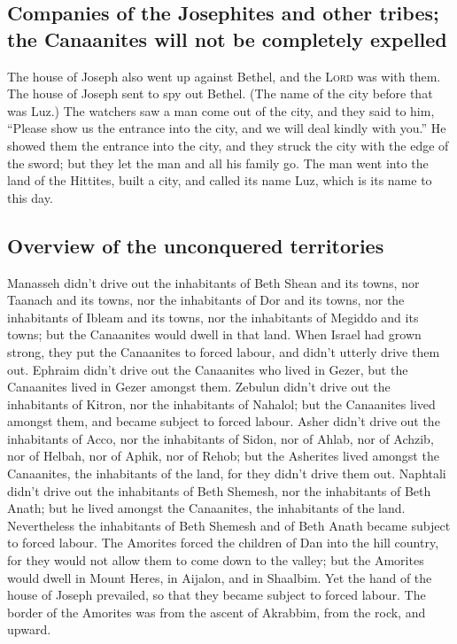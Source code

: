 \hypertarget{companies-of-the-josephites-and-other-tribes-the-canaanites-will-not-be-completely-expelled}{%
\subsection{Companies of the Josephites and other tribes; the Canaanites
will not be completely
expelled}\label{companies-of-the-josephites-and-other-tribes-the-canaanites-will-not-be-completely-expelled}}

 The house of Joseph also went up against Bethel, and the
\textsc{Lord} was with them.  The house of Joseph sent to
spy out Bethel. (The name of the city before that was Luz.)
 The watchers saw a man come out of the city, and they
said to him, ``Please show us the entrance into the city, and we will
deal kindly with you.''  He showed them the entrance into
the city, and they struck the city with the edge of the sword; but they
let the man and all his family go.  The man went into the
land of the Hittites, built a city, and called its name Luz, which is
its name to this day.

\hypertarget{overview-of-the-unconquered-territories}{%
\subsection{Overview of the unconquered
territories}\label{overview-of-the-unconquered-territories}}

 Manasseh didn't drive out the inhabitants of Beth Shean
and its towns, nor Taanach and its towns, nor the inhabitants of Dor and
its towns, nor the inhabitants of Ibleam and its towns, nor the
inhabitants of Megiddo and its towns; but the Canaanites would dwell in
that land.  When Israel had grown strong, they put the
Canaanites to forced labour, and didn't utterly drive them out.
 Ephraim didn't drive out the Canaanites who lived in
Gezer, but the Canaanites lived in Gezer amongst them. 
Zebulun didn't drive out the inhabitants of Kitron, nor the inhabitants
of Nahalol; but the Canaanites lived amongst them, and became subject to
forced labour.  Asher didn't drive out the inhabitants of
Acco, nor the inhabitants of Sidon, nor of Ahlab, nor of Achzib, nor of
Helbah, nor of Aphik, nor of Rehob;  but the Asherites
lived amongst the Canaanites, the inhabitants of the land, for they
didn't drive them out.  Naphtali didn't drive out the
inhabitants of Beth Shemesh, nor the inhabitants of Beth Anath; but he
lived amongst the Canaanites, the inhabitants of the land. Nevertheless
the inhabitants of Beth Shemesh and of Beth Anath became subject to
forced labour.  The Amorites forced the children of Dan
into the hill country, for they would not allow them to come down to the
valley;  but the Amorites would dwell in Mount Heres, in
Aijalon, and in Shaalbim. Yet the hand of the house of Joseph prevailed,
so that they became subject to forced labour.  The border
of the Amorites was from the ascent of Akrabbim, from the rock, and
upward.

